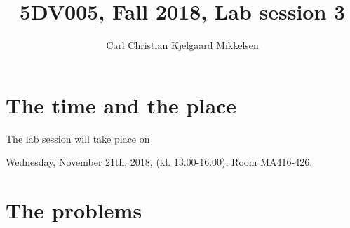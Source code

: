 \documentclass[a4paper,12pt]{article}
\newcounter{problem}
\begin{document}
\title{5DV005, Fall 2018, Lab session 3}
\author{Carl Christian Kjelgaard Mikkelsen}

\maketitle
\tableofcontents

\section{The time and the place}
The lab session will take place on
\begin{center}
Wednesday, November 21th, 2018, (kl. 13.00-16.00), Room MA416-426.
\end{center}

\section{The problems}
\end{document}
